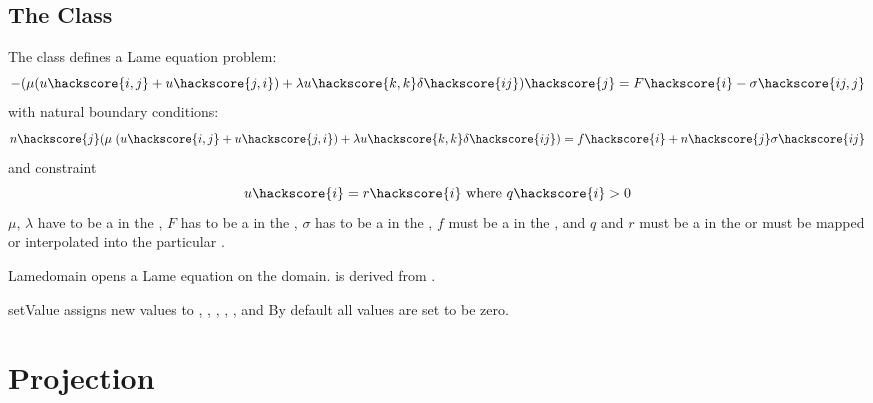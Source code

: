 \subsection{The \Lame Class}
The \Lame class defines a Lame equation problem:
\begin{equation}\label{LE.1}
-(\mu (u\hackscore{i,j}+u\hackscore{j,i})+\lambda u\hackscore{k,k}\delta\hackscore{ij})\hackscore{j} = F\hackscore{i}-\sigma\hackscore{ij,j}
\end{equation}
with natural boundary conditions:
\begin{equation}\label{LE.2}
n\hackscore{j}(\mu \; (u\hackscore{i,j}+u\hackscore{j,i})+\lambda u\hackscore{k,k}\delta\hackscore{ij}) = f\hackscore{i}+n\hackscore{j}\sigma\hackscore{ij}
\end{equation}
and constraint
\begin{equation}\label{LE.3}
u\hackscore{i}=r\hackscore{i} \mbox{ where } q\hackscore{i}>0
\end{equation}
$\mu$, $\lambda$ have to be a \Scalar in the \Function,
$F$ has to be a \Vector in the \Function,
$\sigma$ has to be a \Tensor in the \Function,
$f$ must be a \Vector in  the \FunctionOnBoundary,
and $q$ and $r$ must be a \Vector in  the \SolutionFS or must be mapped or interpolated into the particular \FunctionSpace.

\begin{classdesc}{Lame}{domain}
opens a Lame equation on the \Domain domain. \Lame is derived from \LinearPDE.
\end{classdesc}
\begin{methoddesc}[Lame]{setValue}{       }
assigns new values to 
,
,
,
,
,
 and
By default all values are set to be zero.
\end{methoddesc}



\section{Projection}
\label{SEC Projection}

